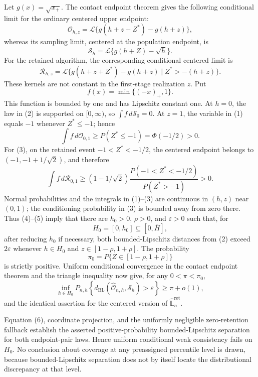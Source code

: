 Let \(g(x)=\sqrt{x_+}\). The contact endpoint theorem gives the following conditional limit for the ordinary centered upper endpoint:
\[
 \mathcal O_{h,z}
 =\mathcal L\{g(h+z+Z^*)-g(h+z)\}, \tag{1}
\]
whereas its sampling limit, centered at the population endpoint, is
\[
 \mathcal S_h
 =\mathcal L\{g(h+Z)-\sqrt h\}. \tag{2}
\]
For the retained algorithm, the corresponding conditional centered limit is
\[
 \mathcal R_{h,z}
 =\mathcal L\{g(h+z+Z^*)-g(h+z)\mid
 Z^*>-(h+z)\}. \tag{3}
\]
These kernels are not constant in the first-stage realization \(z\). Put
\[
 f(x)=\min\{(-x)_+,1\}.
\]
This function is bounded by one and has Lipschitz constant one. At \(h=0\), the law in (2) is supported on \([0,\infty)\), so \(\int f\,d\mathcal S_0=0\). At \(z=1\), the variable in (1) equals \(-1\) whenever \(Z^*\leq-1\); hence
\[
 \int f\,d\mathcal O_{0,1}
 \geq P(Z^*\leq-1)=\Phi(-1/2)>0. \tag{4}
\]
For (3), on the retained event \(-1<Z^*<-1/2\), the centered endpoint belongs to \((-1,-1+1/\sqrt2)\), and therefore
\[
 \int f\,d\mathcal R_{0,1}
 \geq (1-1/\sqrt2)
 \frac{P(-1<Z^*<-1/2)}{P(Z^*>-1)}>0. \tag{5}
\]
Normal probabilities and the integrals in (1)--(3) are continuous in \((h,z)\) near \((0,1)\); the conditioning probability in (3) is bounded away from zero there. Thus (4)--(5) imply that there are \(h_0>0\), \(\rho>0\), and \(\varepsilon>0\) such that, for
\[
 H_0=[0,h_0]\subseteq[0,\bar H],
\]
after reducing \(h_0\) if necessary, both bounded-Lipschitz distances from (2) exceed \(2\varepsilon\) whenever \(h\in H_0\) and \(z\in[1-\rho,1+\rho]\). The probability
\[
 \pi_0=P\{Z\in[1-\rho,1+\rho]\}
\]
is strictly positive. Uniform conditional convergence in the contact endpoint theorem and the triangle inequality now give, for any \(0<\pi<\pi_0\),
\[
 \inf_{h\in H_0}P_{n,h}\!\left\{
 d_{\mathrm{BL}}(\widehat{\mathcal O}_{n,h},\mathcal S_h)
 >\varepsilon\right\}\geq\pi+o(1), \tag{6}
\]
and the identical assertion for the centered version of \(\widehat{\mathbb L}_n^{\mathrm{ret}}\).

Equation (6), coordinate projection, and the uniformly negligible zero-retention fallback establish the asserted positive-probability bounded-Lipschitz separation for both endpoint-pair laws. Hence uniform conditional weak consistency fails on \(H_0\). No conclusion about coverage at any preassigned percentile level is drawn, because bounded-Lipschitz separation does not by itself locate the distributional discrepancy at that level.
